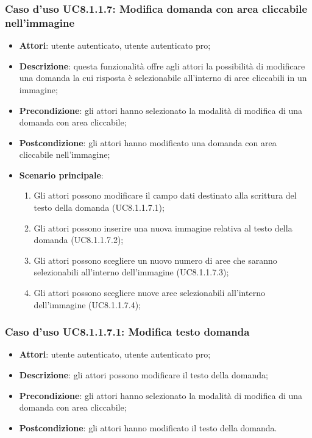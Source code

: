 \subsubsection{Caso d'uso UC8.1.1.7: Modifica domanda con area cliccabile nell'immagine}
\begin{itemize}
	\item \textbf{Attori}: utente autenticato, utente autenticato pro;
	\item \textbf{Descrizione}: questa funzionalità offre agli attori la possibilità di modificare una domanda la cui risposta è selezionabile all'interno di aree cliccabili in un immagine;
	\item \textbf{Precondizione}: gli attori hanno selezionato la modalità di modifica di una domanda con area cliccabile; 
	\item \textbf{Postcondizione}: gli attori hanno modificato una domanda con area cliccabile nell'immagine;
	\item \textbf{Scenario principale}:
		\begin{enumerate}
	       	\item Gli attori possono modificare il campo dati destinato alla scrittura del testo della domanda (UC8.1.1.7.1);
	        \item Gli attori possono inserire una nuova immagine relativa al testo della domanda (UC8.1.1.7.2);
			\item Gli attori possono scegliere un nuovo numero di aree che saranno selezionabili all'interno dell'immagine (UC8.1.1.7.3);
			\item Gli attori possono scegliere nuove aree selezionabili all'interno dell'immagine (UC8.1.1.7.4);
	 	\end{enumerate}
\end{itemize}

\subsubsection{Caso d'uso UC8.1.1.7.1: Modifica testo domanda}
\begin{itemize}
	\item \textbf{Attori}: utente autenticato, utente autenticato pro;
	\item \textbf{Descrizione}: gli attori possono modificare il testo della domanda;
	\item \textbf{Precondizione}: gli attori hanno selezionato la modalità di modifica di una domanda con area cliccabile;
	\item \textbf{Postcondizione}: gli attori hanno modificato il testo della domanda.
\end{itemize}


